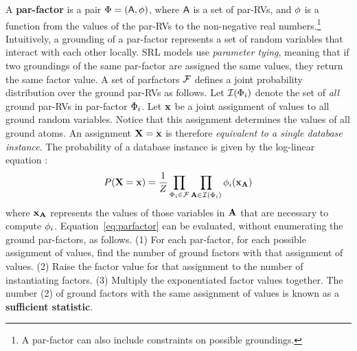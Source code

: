 \documentclass{article} %
\begin{document}
A \textbf{par-factor} is a pair $\Phi = (\mathsf{A},\phi)$, where $\mathsf{A}$ is a set of par-RVs, and $\phi$ is a function from the values of the par-RVs to the non-negative real numbers.\footnote{A par-factor can also include constraints on possible groundings.} Intuitively, a grounding of a par-factor represents a set of random variables that interact with each other locally. SRL models use {\em parameter tying}, meaning that if two groundings of the same par-factor are assigned the same values, they return the same factor value. A set of parfactors $\mathcal{F}$ defines a joint probability distribution over the ground par-RVs as follows. Let $\mathcal{I}(\Phi_{i})$ denote the set of {\em all} ground par-RVs in par-factor $\Phi_{i}$. Let $\mathbf{x}$ be a joint assignment of values to all ground random variables. Notice that this assignment determines the values of all ground atoms. An assignment $\mathbf{X}=\mathbf{x}$ is therefore {\em equivalent to a single database instance}.
The probability of a database instance is given by the log-linear equation \cite[Eq.7]{Kimmig2015}:
\begin{equation} \label{eq:parfactor}
P(\mathbf{X}=\mathbf{x}) = \frac{1}{Z} \prod_{\Phi_{i} \in \mathcal{F}} \prod_{\mathbf{A} \in \mathcal{I}(\Phi_{i})} 
\phi_{i}(\mathbf{x}_{\mathbf{A}}) 
\end{equation}
where $\mathbf{x}_{\mathbf{A}}$ represents the values of those variables in $\mathbf{A}$ that are necessary to compute $\phi_{i}$. 
Equation~\ref{eq:parfactor} can be evaluated, without enumerating the ground par-factors, 
as follows. 
%
%
(1) For each par-factor, for each possible assignment of values, find the number of ground factors with that assignment of values. (2) Raise the factor value for that assignment to the number of instantiating factors. (3) Multiply the exponentiated factor values together.  The number (2) of ground factors with the same assignment of values is known as a \textbf{sufficient statistic}.
\end{document}
